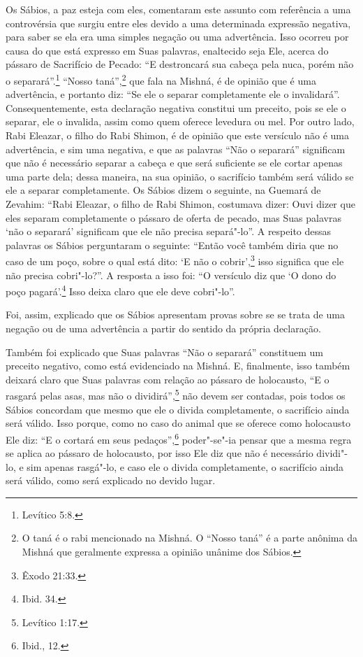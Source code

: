 Os Sábios, a paz esteja com eles, comentaram este assunto com
referência a uma controvérsia que surgiu entre eles devido a uma
determinada expressão negativa, para saber se ela era uma simples
negação ou uma advertência. Isso ocorreu por causa do que está expresso
em Suas palavras, enaltecido seja Ele, acerca do pássaro de Sacrifício
de Pecado: ``E destroncará sua cabeça pela nuca, porém não o separará''.\footnote{Levítico 5:8.} ``Nosso taná\starr'',\footnote{O taná\starr{} é o rabi mencionado na Mishná\starr. O ``Nosso taná\starr{}'' é a
parte anônima da Mishná\starr{} que geralmente expressa a opinião unânime dos
Sábios.} que fala na Mishná\starr,
é de opinião que é uma advertência, e portanto diz: ``Se ele o separar
completamente ele o invalidará''. Consequentemente, esta declaração
negativa constitui um preceito, pois se ele o separar, ele o invalida,
assim como quem oferece levedura ou mel. Por outro lado, Rabi Eleazar\starr, o
filho do Rabi Shimon, é de opinião que este versículo não é uma
advertência, e sim uma negativa, e que as palavras ``Não o separará''
significam que não é necessário separar a cabeça e que será suficiente
se ele cortar apenas uma parte dela; dessa maneira, na sua opinião, o
sacrifício também será válido se ele a separar completamente. Os Sábios
dizem o seguinte, na Guemará\starr{} de Zevahim\starr: ``Rabi Eleazar\starr, o filho de Rabi
Shimon, costumava dizer: Ouvi dizer que eles separam completamente o
pássaro de oferta de pecado, mas Suas palavras `não o separará'
significam que ele não precisa separá"-lo''. A respeito dessas palavras
os Sábios perguntaram o seguinte: ``Então você também diria que no caso
de um poço, sobre o qual está
dito: `E não o cobrir',\footnote{Êxodo 21:33.} isso significa que ele não precisa
cobri"-lo?''. A resposta a isso foi: ``O versículo diz que `O dono do
poço pagará'.\footnote{Ibid. 34.} Isso deixa claro que ele deve cobri"-lo''.

Foi, assim, explicado que os Sábios apresentam provas sobre se se trata
de uma negação ou de uma advertência a partir do sentido da própria
declaração.

Também foi explicado que Suas palavras ``Não o separará'' constituem um
preceito negativo, como está evidenciado na Mishná\starr. E, finalmente, isso
também deixará claro que Suas palavras com relação ao pássaro de
holocausto, ``E o rasgará pelas asas, mas não o dividirá'',\footnote{Levítico
1:17.} não devem ser contadas, pois todos os Sábios concordam que mesmo
que ele o divida completamente, o sacrifício ainda será válido. Isso
porque, como no caso do animal que se oferece como holocausto Ele diz:
``E o cortará em seus pedaços'',\footnote{Ibid., 12.} poder"-se"-ia pensar que a
mesma regra se aplica ao pássaro de holocausto, por isso Ele diz que
não é necessário dividi"-lo, e sim apenas rasgá"-lo, e caso ele o divida
completamente, o sacrifício ainda será válido, como será explicado no
devido lugar.

